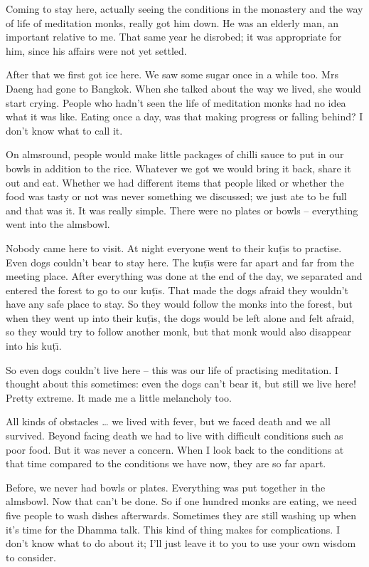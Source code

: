 Coming to stay here, actually seeing the conditions in the monastery and the way of life of meditation monks, really got him down. He was an elderly man, an important relative to me. That same year he disrobed; it was appropriate for him, since his affairs were not yet settled.

After that we first got ice here. We saw some sugar once in a while too. Mrs Daeng had gone to Bangkok. When she talked about the way we lived, she would start crying. People who hadn't seen the life of meditation monks had no idea what it was like. Eating once a day, was that making progress or falling behind? I don't know what to call it.

On almsround, people would make little packages of chilli sauce to put in our bowls in addition to the rice. Whatever we got we would bring it back, share it out and eat. Whether we had different items that people liked or whether the food was tasty or not was never something we discussed; we just ate to be full and that was it. It was really simple. There were no plates or bowls -- everything went into the almsbowl.

Nobody came here to visit. At night everyone went to their ku\d{t}\={\i}s to practise. Even dogs couldn't bear to stay here. The ku\d{t}\={\i}s were far apart and far from the meeting place. After everything was done at the end of the day, we separated and entered the forest to go to our ku\d{t}\={\i}s. That made the dogs afraid they wouldn't have any safe place to stay. So they would follow the monks into the forest, but when they went up into their ku\d{t}\={\i}s, the dogs would be left alone and felt afraid, so they would try to follow another monk, but that monk would also disappear into his ku\d{t}\={\i}.

So even dogs couldn't live here -- this was our life of practising meditation. I thought about this sometimes: even the dogs can't bear it, but still we live here! Pretty extreme. It made me a little melancholy too.

All kinds of obstacles \ldots{} we lived with fever, but we faced death and we all survived. Beyond facing death we had to live with difficult conditions such as poor food. But it was never a concern. When I look back to the conditions at that time compared to the conditions we have now, they are so far apart.

Before, we never had bowls or plates. Everything was put together in the almsbowl. Now that can't be done. So if one hundred monks are eating, we need five people to wash dishes afterwards. Sometimes they are still washing up when it's time for the Dhamma talk. This kind of thing makes for complications. I don't know what to do about it; I'll just leave it to you to use your own wisdom to consider.

